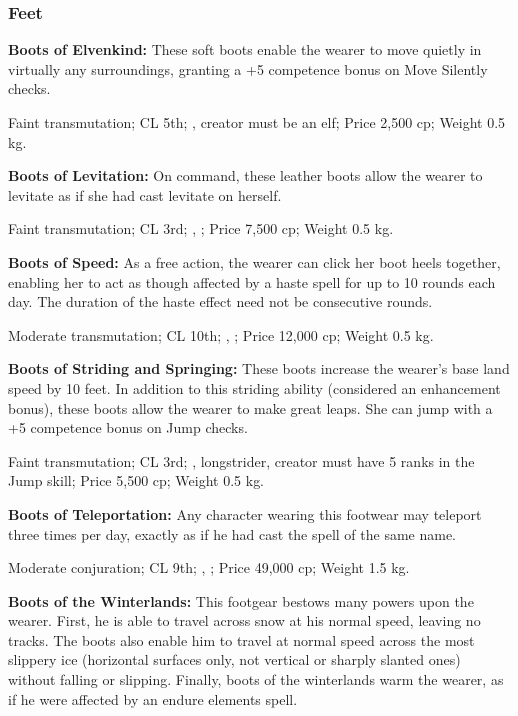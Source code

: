 \subsubsection{Feet}

\textbf{Boots of Elvenkind:} These soft boots enable the wearer to move quietly in virtually any surroundings, granting a +5 competence bonus on Move Silently checks.

Faint transmutation; CL 5th; , creator must be an elf; Price 2,500 cp; Weight 0.5 kg.

\textbf{Boots of Levitation:} On command, these leather boots allow the wearer to levitate as if she had cast levitate on herself.

Faint transmutation; CL 3rd; , ; Price 7,500 cp; Weight 0.5 kg.

\textbf{Boots of Speed:} As a free action, the wearer can click her boot heels together, enabling her to act as though affected by a haste spell for up to 10 rounds each day. The duration of the haste effect need not be consecutive rounds.

Moderate transmutation; CL 10th; , ; Price 12,000 cp; Weight 0.5 kg.

\textbf{Boots of Striding and Springing:} These boots increase the wearer's base land speed by 10 feet. In addition to this striding ability (considered an enhancement bonus), these boots allow the wearer to make great leaps. She can jump with a +5 competence bonus on Jump checks.

Faint transmutation; CL 3rd; , longstrider, creator must have 5 ranks in the Jump skill; Price 5,500 cp; Weight 0.5 kg.

\textbf{Boots of Teleportation:} Any character wearing this footwear may teleport three times per day, exactly as if he had cast the spell of the same name.

Moderate conjuration; CL 9th; , ; Price 49,000 cp; Weight 1.5 kg.

\textbf{Boots of the Winterlands:} This footgear bestows many powers upon the wearer. First, he is able to travel across snow at his normal speed, leaving no tracks. The boots also enable him to travel at normal speed across the most slippery ice (horizontal surfaces only, not vertical or sharply slanted ones) without falling or slipping. Finally, boots of the winterlands warm the wearer, as if he were affected by an endure elements spell.

